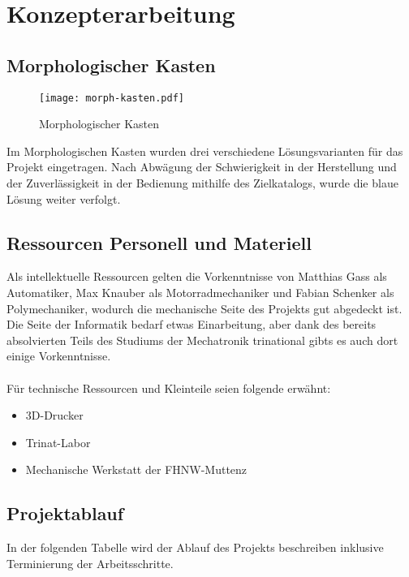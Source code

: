 \section{Konzepterarbeitung}

\subsection{Morphologischer Kasten}

\begin{figure}[H]
    \begin{center}
    \texttt{[image: morph-kasten.pdf]}
    \end{center}
    \caption{Morphologischer Kasten}
\end{figure}

Im Morphologischen Kasten wurden drei verschiedene Lösungsvarianten für das Projekt eingetragen. Nach Abwägung der Schwierigkeit in der Herstellung und der Zuverlässigkeit in der Bedienung mithilfe des Zielkatalogs, wurde die blaue Lösung weiter verfolgt.

\subsection{Ressourcen Personell und Materiell}
Als intellektuelle Ressourcen gelten die Vorkenntnisse von Matthias Gass als Automatiker, Max Knauber als Motorradmechaniker und Fabian Schenker als Polymechaniker, wodurch die mechanische Seite des Projekts gut abgedeckt ist. Die Seite der Informatik bedarf etwas Einarbeitung, aber dank des bereits absolvierten Teils des Studiums der Mechatronik trinational gibts es auch dort einige Vorkenntnisse. \\
\\
Für technische Ressourcen und Kleinteile seien folgende erwähnt:
\begin{itemize}
    \item 3D-Drucker
    \item Trinat-Labor
    \item Mechanische Werkstatt der FHNW-Muttenz
\end{itemize}

\subsection{Projektablauf}
In der folgenden Tabelle wird der Ablauf des Projekts beschreiben inklusive Terminierung der Arbeitsschritte.

